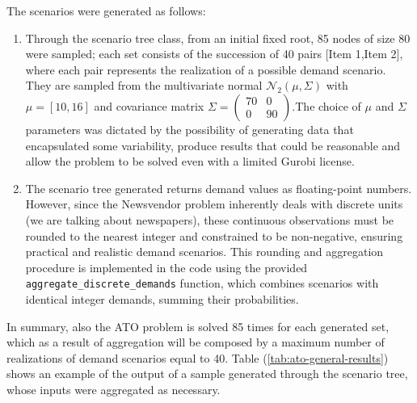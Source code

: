 \documentclass[a4paper,12pt]{article}
\begin{document}
	\noindent The scenarios were generated as follows: 
	\begin{enumerate}
		\item Through the scenario tree class, from an initial fixed root, 85 nodes of size 80 were sampled; each set consists of the succession of 40 pairs [Item 1,Item 2], where each pair represents the realization of a possible demand scenario. They are sampled from the multivariate normal $\mathcal{N}_{2}(\mu, \Sigma)$ with $\mu = [10,16]$ and covariance matrix $\Sigma =  \begin{pmatrix} 70 &0  \\ 0 &90  \end{pmatrix} $.The choice of $\mu$ and $\Sigma$ parameters was dictated by the possibility of generating data that encapsulated some variability, produce results that could be reasonable and allow the problem to be solved even with a limited Gurobi license. 
		
		\item The scenario tree generated returns demand values as floating-point numbers. However, since the Newsvendor problem inherently deals with discrete units (we are talking about newspapers), these continuous observations must be rounded to the nearest integer and constrained to be non-negative, ensuring practical and realistic demand scenarios. This rounding and aggregation procedure is implemented in the code using the provided \texttt{aggregate\_discrete\_demands} function, which combines scenarios with identical integer demands, summing their probabilities.
		
	\end{enumerate}
	
	\noindent In summary, also the ATO problem is solved 85 times for each generated set, which as a result of aggregation will be composed by a maximum number of realizations of demand scenarios equal to 40. Table (\ref{tab:ato-general-results}) shows an example of the output of a sample generated through the scenario tree, whose inputs were aggregated as necessary.
\end{document}

